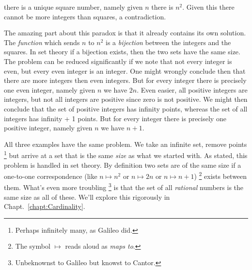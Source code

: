             there is a unique square number, namely given $n$ there is $n^{2}$.
            Given this there cannot be more integers than squares, a
            contradiction.
            \par\hfill\par
            The amazing part about this paradox is that it already contains its
            own solution. The \textit{function} which sends $n$ to $n^{2}$ is a
            \textit{bijection} between the integers and the squares. In set
            theory if a bijection exists, then the two sets have the same
            size. The problem can be reduced significantly if we note that not
            every integer is even, but every even integer is an integer. One
            might wrongly conclude then that there are more integers then even
            integers. But for every integer there is precisely one even integer,
            namely given $n$ we have $2n$. Even easier, all positive integers
            are integers, but not all integers are positive since zero is not
            positive. We might then conclude that the set of positive integers
            has infinity points, whereas the set of all integers has infinity
            + 1 points. But for every integer there is precisely one positive
            integer, namely given $n$ we have $n+1$.
            \par\hfill\par
            All three examples have the same problem. We take an infinite set,
            remove points%
            \footnote{%
                Perhaps infinitely many, as Galileo did.
            }
            but arrive at a set that is the same \textit{size} as what we
            started with. As stated, this problem is handled in set theory. By
            definition two sets are of the same size if a one-to-one
            correspondence (like $n\mapsto{n}^{2}$ or $n\mapsto{2n}$ or
            $n\mapsto{n}+1$)%
            \footnote{%
                The symbol $\mapsto$ reads aloud as \textit{maps to}.
            }
            exists between them. What's even more troubling%
            \footnote{%
                Unbeknownst to Galileo but knowst to Cantor.
            }
            is that the set of all \textit{rational} numbers is the same size as
            all of these. We'll explore this rigorously in
            Chapt.~\ref{chapt:Cardinality}.
